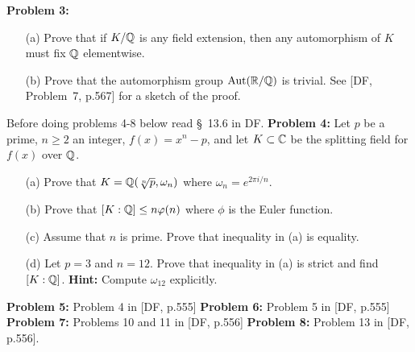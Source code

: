 \documentclass[12pt]{amsart}
\begin{document}
{\bf Problem 3:} 
\begin{itemize}
\item[(a)] Prove that if  $K/{\mathbb Q}$ is any field extension,
then any automorphism of $K$ must fix ${\mathbb Q}$ elementwise.

\item[(b)] Prove that the automorphism group ${\rm Aut}({\mathbb R}/{\mathbb Q})$ is trivial.
See [DF, Problem~7, p.567] for a sketch of the proof.
\end{itemize}
\skv
Before doing problems 4-8 below read \S~13.6 in DF.
\skv
{\bf Problem 4:} \rm 
Let $p$ be a prime, $n\geq 2$ an integer, $f(x)=x^n-p$, and let
$K\subset {\mathbb C}$ be the splitting field for $f(x)$ over ${\mathbb Q}$.
\begin{itemize}
\item[(a)] Prove that $K={\mathbb Q}(\sqrt[n]{p},\omega_n)$ where
$\omega_n=e^{2\pi i/n}$.
\item[(b)] Prove that $[K:{\mathbb Q}]\leq n\varphi(n)$ where $\phi$
is the Euler function.
\item[(c)] Assume that $n$ is prime. Prove that inequality in (a)
is equality.
\item[(d)] Let $p=3$ and $n=12$. Prove that inequality in (a)
is strict and find $[K:{\mathbb Q}]$. {\bf Hint:} Compute $\omega_{12}$
explicitly.
\end{itemize}
\skv
{\bf Problem 5:} Problem 4 in [DF, p.555]
\skv
{\bf Problem 6:} Problem 5 in [DF, p.555]
\skv
{\bf Problem 7:} Problems 10 and 11 in [DF, p.556]
\skv
{\bf Problem 8:} Problem 13 in [DF, p.556]. 
\end{document}
